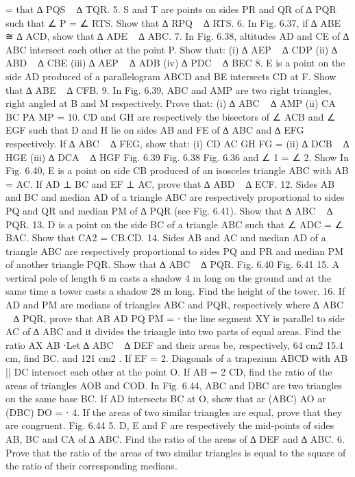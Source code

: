 \begin{enumerate}[label=\arabic*.,ref=\thesubsection.\theenumi]
= that ∆ PQS ~ ∆ TQR.
5. S and T are points on sides PR and QR of ∆ PQR such that ∠ P = ∠ RTS. Show that ∆ RPQ ~ ∆ RTS.
6. In Fig. 6.37, if ∆ ABE ≅ ∆ ACD, show that ∆ ADE ~ ∆ ABC.
7. In Fig. 6.38, altitudes AD and CE of ∆ ABC intersect each other at the point P. Show that:
(i) ∆ AEP ~ ∆ CDP (ii) ∆ ABD ~ ∆ CBE (iii) ∆ AEP ~ ∆ ADB (iv) ∆ PDC ~ ∆ BEC
8. E is a point on the side AD produced of a parallelogram ABCD and BE intersects CD at F. Show that ∆ ABE ~ ∆ CFB.
9. In Fig. 6.39, ABC and AMP are two right triangles, right angled at B and M respectively. Prove that: (i) ∆ ABC ~ ∆ AMP
(ii)
CA BC PA MP
=
10. CD and GH are respectively the bisectors of ∠ ACB and ∠ EGF such that D and H lie on sides AB and FE of ∆ ABC and ∆ EFG respectively. If ∆ ABC ~ ∆ FEG, show that:
(i)
CD AC GH FG
=
(ii) ∆ DCB ~ ∆ HGE (iii) ∆ DCA ~ ∆ HGF
Fig. 6.39 Fig. 6.38 Fig. 6.36 and ∠ 1 = ∠ 2. Show
In Fig. 6.40, E is a point on side CB produced of an isosceles triangle ABC with AB = AC. If AD ⊥ BC and EF ⊥ AC, prove that ∆ ABD ~ ∆ ECF.
12. Sides AB and BC and median AD of a triangle ABC are respectively proportional to sides PQ and QR and median PM of ∆ PQR (see Fig. 6.41). Show that ∆ ABC ~ ∆ PQR.
13. D is a point on the side BC of a triangle ABC such that ∠ ADC = ∠ BAC. Show that CA2
= CB.CD.
14. Sides AB and AC and median AD of a triangle ABC are respectively proportional to sides PQ and PR and median PM of another triangle PQR. Show that ∆ ABC ~ ∆ PQR.
Fig. 6.40 Fig. 6.41
15. A vertical pole of length 6 m casts a shadow 4 m long on the ground and at the same time a tower casts a shadow 28 m long. Find the height of the tower.
16. If AD and PM are medians of triangles ABC and PQR, respectively where ∆ ABC ~ ∆ PQR, prove that
AB AD PQ PM
= ⋅
the line segment XY is parallel to side AC of ∆ ABC and it divides the triangle into two parts of equal
areas. Find the ratio
AX AB
⋅Let ∆ ABC ~ ∆ DEF and their areas be, respectively, 64 cm2 15.4 cm, find BC.
and 121 cm2 . If EF =
2. Diagonals of a trapezium ABCD with AB || DC intersect each other at the point O. If AB = 2 CD, find the ratio of the areas of triangles AOB and COD.
In Fig. 6.44, ABC and DBC are two triangles on the same base BC. If AD intersects BC at O, show that
ar (ABC) AO ar (DBC) DO
= ⋅
4. If the areas of two similar triangles are equal, prove that they are congruent.
Fig. 6.44
5. D, E and F are respectively the mid-points of sides AB, BC and CA of ∆ ABC. Find the ratio of the areas of ∆ DEF and ∆ ABC.
6. Prove that the ratio of the areas of two similar triangles is equal to the square of the ratio of their corresponding medians.

\end{enumerate}
